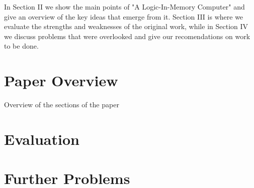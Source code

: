 \documentclass[12pt,twocolumn]{IEEEtran}
\begin{document}
In Section II we show the main points of "A Logic-In-Memory Computer" and give an overview of the key ideas that emerge from it. Section III is where we evaluate the strengths and weaknesses of the original work, while in Section IV we discuss problems that were overlooked and give our recomendations on work to be done.

\section{Paper Overview}
Overview of the sections of the paper

\section{Evaluation}

\section{Further Problems}



\end{document}
